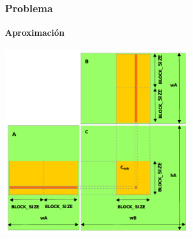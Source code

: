 \frame
{
\frametitle{Problema}
\framesubtitle{Aproximación}
\begin{center}
	\includegraphics[width=0.6\textwidth]{img/matrix}
\end{center}
}
